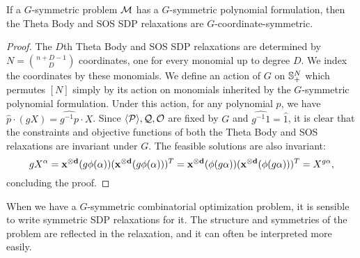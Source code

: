 \begin{lemma}
If a $G$-symmetric problem $\mathcal M$ has a $G$-symmetric polynomial formulation, then the Theta Body and SOS SDP relaxations are $G$-coordinate-symmetric.
\end{lemma}
\begin{proof}
The $D$th Theta Body and SOS SDP relaxations are determined by $N = \binom{n+D-1}{D}$ coordinates, one for every monomial up to degree $D$. We index the coordinates by these monomials. We define an action of $G$ on $\mathbb{S}^{N}_+$ which permutes $[N]$ simply by its action on monomials inherited by the $G$-symmetric polynomial formulation. Under this action, for any polynomial $p$, we have $\hat{p}\cdot (gX) = \widehat{g^{-1}p} \cdot X$. Since $\langle \mathcal P \rangle,\mathcal Q,\mathcal O$ are fixed by $G$ and $\widehat{g^{-1}1} = \hat{1}$, it is clear that the constraints and objective functions of both the Theta Body and SOS relaxations are invariant under $G$. The feasible solutions are also invariant:
\[gX^\alpha = \mathbf{x^{\otimes d}}(g\phi(\alpha))(\mathbf{x^{\otimes d}}(g\phi(\alpha)))^T = \mathbf{x^{\otimes d}}(\phi(g\alpha))(\mathbf{x^{\otimes d}}(\phi(g\alpha)))^T = X^{g\alpha},\]
concluding the proof.
\end{proof}

When we have a $G$-symmetric combinatorial optimization problem, it is sensible to write symmetric SDP relaxations for it.
The structure and symmetries of the problem are reflected in the relaxation, and it can often be interpreted more easily.
